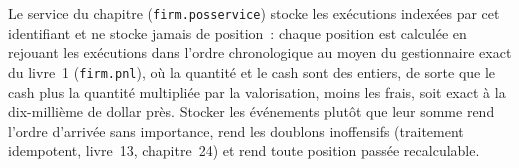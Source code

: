 Le service du chapitre (\texttt{firm.posservice}) stocke les exécutions indexées par cet identifiant et ne stocke jamais de position~: chaque position est
calculée en rejouant les exécutions dans l'ordre chronologique au moyen du gestionnaire exact du livre~1 (\texttt{firm.pnl}), où la quantité et le cash sont des
entiers, de sorte que le cash plus la quantité multipliée par la valorisation, moins les frais, soit exact à la dix-millième de dollar près. Stocker les événements plutôt que leur
somme rend l'ordre d'arrivée sans importance, rend les doublons inoffensifs (traitement idempotent, livre~13, chapitre~24) et rend toute position passée
recalculable.

\label{lst:pl:position-and-pnl-services:events}

\label{lst:pl:position-and-pnl-services:position}

